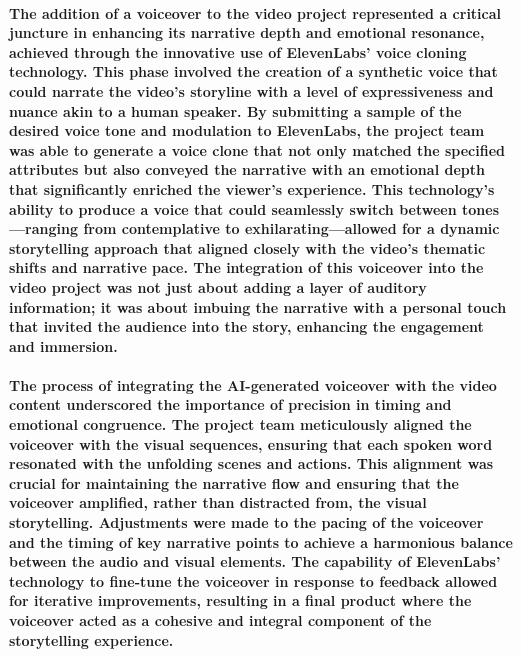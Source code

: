 \documentclass[11pt,a4paper,oneside]{report}
\begin{document}
\paragraph{The addition of a voiceover to the video project represented a critical juncture in enhancing its narrative depth and emotional resonance, achieved through the innovative use of ElevenLabs' voice cloning technology. This phase involved the creation of a synthetic voice that could narrate the video's storyline with a level of expressiveness and nuance akin to a human speaker. By submitting a sample of the desired voice tone and modulation to ElevenLabs, the project team was able to generate a voice clone that not only matched the specified attributes but also conveyed the narrative with an emotional depth that significantly enriched the viewer's experience. This technology's ability to produce a voice that could seamlessly switch between tones—ranging from contemplative to exhilarating—allowed for a dynamic storytelling approach that aligned closely with the video's thematic shifts and narrative pace. The integration of this voiceover into the video project was not just about adding a layer of auditory information; it was about imbuing the narrative with a personal touch that invited the audience into the story, enhancing the engagement and immersion.}

\paragraph{The process of integrating the AI-generated voiceover with the video content underscored the importance of precision in timing and emotional congruence. The project team meticulously aligned the voiceover with the visual sequences, ensuring that each spoken word resonated with the unfolding scenes and actions. This alignment was crucial for maintaining the narrative flow and ensuring that the voiceover amplified, rather than distracted from, the visual storytelling. Adjustments were made to the pacing of the voiceover and the timing of key narrative points to achieve a harmonious balance between the audio and visual elements. The capability of ElevenLabs' technology to fine-tune the voiceover in response to feedback allowed for iterative improvements, resulting in a final product where the voiceover acted as a cohesive and integral component of the storytelling experience.}
\end{document}
